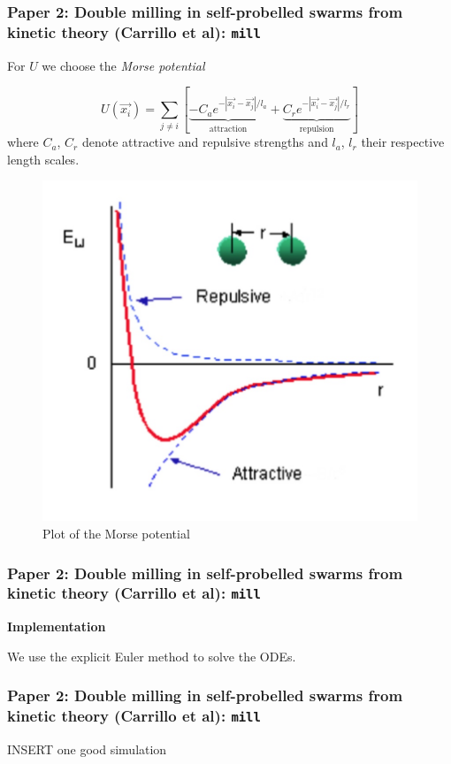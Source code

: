 \documentclass[compress]{beamer}
\begin{document}
\begin{frame}
	\frametitle{Paper 2: Double milling in self-probelled swarms from kinetic theory (Carrillo et al): \texttt{mill}}
	

For \( U \) we choose the \textit{Morse potential} %

\begin{equation} \label{morsePotential}
U(\vec{x_{i}}) = \sum_{j \neq i}^{} [ \underbrace{-C_{a} e^{-| \vec{x_{i}} - \vec{x_{j}} | / l_{a}}}_{\text{attraction}} + \underbrace{C_{r}e^{-|\vec{x_{i}}-\vec{x_{j}}|/l_{r}}}_{\text{repulsion}} ]
\end{equation}
where \( C_{a}\), \( C_{r}\) denote attractive and repulsive strengths and \( l_{a}\), \( l_{r}\) their respective length scales.


\begin{figure}
\includegraphics[width=.35\columnwidth]{./img/Morsepotential.jpg}
\caption{Plot of the Morse potential}
\label{morsepotential}
\end{figure}

\end{frame}



\begin{frame}
	\frametitle{Paper 2: Double milling in self-probelled swarms from kinetic theory (Carrillo et al): \texttt{mill}}
	
	\textbf{Implementation}
	
	We use the explicit Euler method to solve the ODEs.

\end{frame}


\begin{frame}
	\frametitle{Paper 2: Double milling in self-probelled swarms from kinetic theory (Carrillo et al): \texttt{mill}}
	
	
	INSERT one good simulation
	
\end{frame}
\end{document}
